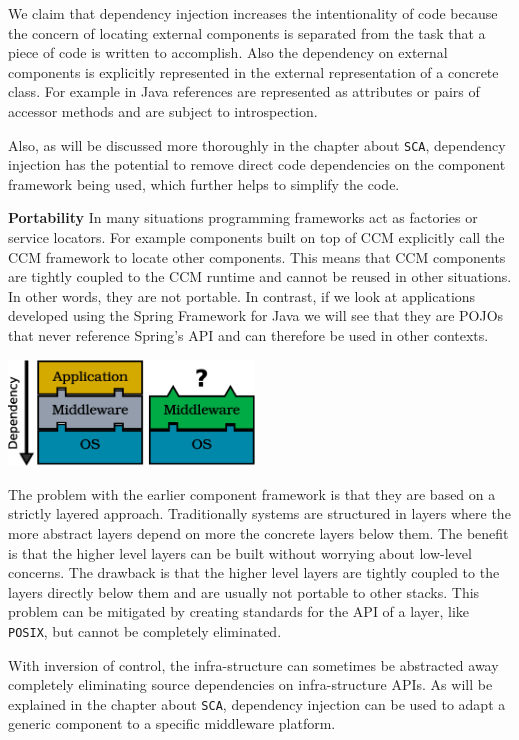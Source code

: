 We claim that dependency injection increases the intentionality of code because the concern of locating external
components is separated from the task that a piece of code is written to accomplish. Also the dependency on external
components is explicitly represented in the external representation of a concrete class. For example in Java
references are represented as attributes or pairs of accessor methods and are subject to introspection.

Also, as will be discussed more thoroughly in the chapter about \texttt{SCA}, dependency injection has the potential
to remove direct code dependencies on the component framework being used, which further helps to simplify the
code.

\textbf{Portability} In many situations programming frameworks act as factories or service locators. For example
components built on top of CCM explicitly call the CCM framework to locate other components. This means that CCM
components are tightly coupled to the CCM runtime and cannot be reused in other situations. In other words, they
are not portable. In contrast, if we look at applications developed using the Spring Framework for Java we will
see that they are POJOs that never reference Spring's API and can therefore be used in other contexts.

\begin{center}
\includegraphics[height=80pt]{graphics_tables/bad_layers.eps} 
\end{center}

The problem with the earlier component framework is that they are based on a strictly layered approach. Traditionally systems
are structured in layers where the more abstract layers depend on more the concrete layers below them. The benefit is that
the higher level layers can be built without worrying about low-level concerns. The drawback is that the higher level
layers are tightly coupled to the layers directly below them and are usually not portable to other stacks.
This problem can be mitigated by creating standards for the API of a layer, like \texttt{POSIX}, but cannot be completely
eliminated. 

With inversion of control, the infra-structure can sometimes be abstracted away completely eliminating source dependencies
on infra-structure APIs. As will be explained in the chapter about \texttt{SCA}, dependency injection can be used to adapt
a generic component to a specific middleware platform.

